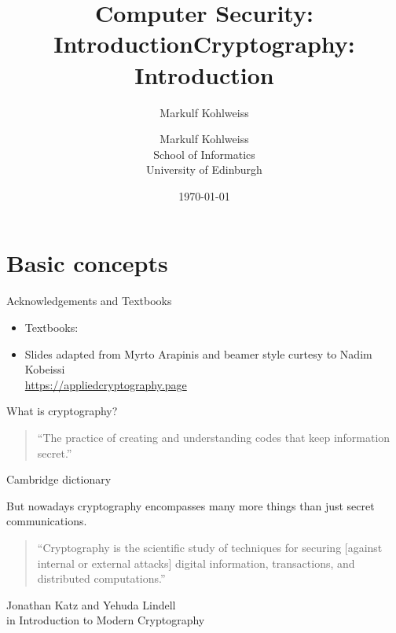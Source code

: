 \documentclass[aspectratio=169, lualatex, handout, 10pt,dvipsnames,svgnames]{beamer} %
\title{Computer Security: Introduction}
\author{Markulf Kohlweiss}
\institute{University of Edinburgh, School of Informatics}
\date{\today}
\title{Cryptography: Introduction}
\author{Markulf Kohlweiss \\
  School of Informatics \\
  University of Edinburgh}
\date{}
\begin{document}

\begin{frame}
  \titlepage
\end{frame}

\section*{Basic concepts}

\begin{frame}{Acknowledgements and Textbooks}
\vspace{-0.5cm}
\begin{itemize}
\item Textbooks:
  \begin{center}
  \end{center}
\item Slides adapted from Myrto Arapinis and beamer style curtesy to Nadim Kobeissi \\ \url{https://appliedcryptography.page}
\end{itemize}
\end{frame}

\begin{frame}{What is cryptography?}
  
  \begin{block}{}
  \begin{quote}
    ``The practice of creating and understanding codes that keep information secret.''
  \end{quote}
  \hfill\small{Cambridge dictionary}
\end{block}
  \pause
  \bigskip
  \bigskip

  But nowadays cryptography encompasses many more things than just secret communications.
  \medskip

  \begin{block}{}
    \begin{quote}
      ``Cryptography is the scientific study of techniques for securing [against internal or external attacks] digital information, transactions, and distributed computations.''
    \end{quote}
    \hfill\small{Jonathan Katz and Yehuda Lindell} \\
    \hfill\small{in Introduction to Modern Cryptography}
  \end{block}
\end{frame}
\end{document}
